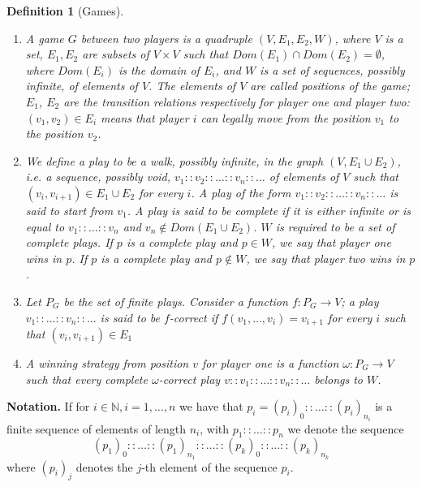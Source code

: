 \documentclass[copyright,creativecommons]{eptcs}
\newcommand{\NatSet}                   {\mathbb{N}}
\newtheorem{definition}{Definition}
\begin{document}
\begin{definition}[Games]
\label{definition-Games}
\begin{enumerate}

 \item
 A \emph{game} $G$ between two players is a quadruple $(V,E_1,E_2, W)$,
where $V$ is a set, $E_1,E_2$ are  subsets of $V\times V$ such that
$Dom(E_1)\cap Dom(E_2)=\emptyset$, where $Dom(E_i)$ is the domain of $E_i$,  and $W$ is a set of sequences,
possibly infinite, of elements of $V$.  The elements of $V$ are
called \emph{positions} of the game; $E_1$, $E_2$ are the transition
relations respectively for player one and player two:
$(v_1,v_2)\in E_i$ means that player $i$ can legally move from the
position $v_1$ to the position $v_2$.

 \item We define a \emph{play} to be a walk, possibly infinite, in the
graph $(V,E_1\cup E_2)$, i.e. a sequence, possibly void,  $v_1::v_2::\ldots:: v_n::\ldots $ of elements of $V$  such that $(v_i, v_{i+1})\in E_1\cup E_2$ for every $i$. A play of the form $v_1:: v_2:: \ldots:: v_n::\ldots $ is said to \emph{start from}  $v_1$. A play is said to be
\emph{complete} if it is either infinite or is equal to $v_1::\ldots:: v_n$ and $v_n\notin Dom(E_1\cup E_2)$. $W$ is required to be a set of
complete plays. If $p$ is a complete play and $p\in  W$, 
we say that player one wins in $p$. If $p$ is a complete play and $p\notin
W$, 
we say that player two wins in $p$.

 \item
 Let $P_G$ be the set of finite plays. Consider a function $f:
P_G\rightarrow V$; a play $v_1::\ldots:: v_n::\ldots$ is said to be
$f$-correct if $f(v_1,\ldots, v_i)=v_{i+1}$ for every $i$ such that
$(v_i,v_{i+1})\in E_1$

 \item
 A \emph{winning strategy} from position $v$ for player one is a function
$\omega: P_G\rightarrow V$ such that every complete
$\omega$-correct play $v::v_1::\ldots :: v_n::\ldots $  belongs to $W$.
 \end{enumerate}
 \end{definition}
 \textbf{Notation.}  If for $i\in \NatSet, i=1,\ldots, n$  we have that $p_i=(p_i)_{0}:: \ldots :: (p_i)_{n_i}$ is a finite sequence of elements of length $n_i$,  with $p_1::\ldots ::p_n$ we denote the sequence \[(p_1)_0::\ldots ::(p_1)_{n_1}:: \ldots :: (p_k)_0::\ldots :: (p_k)_{n_k}\] where $(p_i)_j$ denotes the $j$-th element of the sequence $p_i$. \\\\
\end{document}
